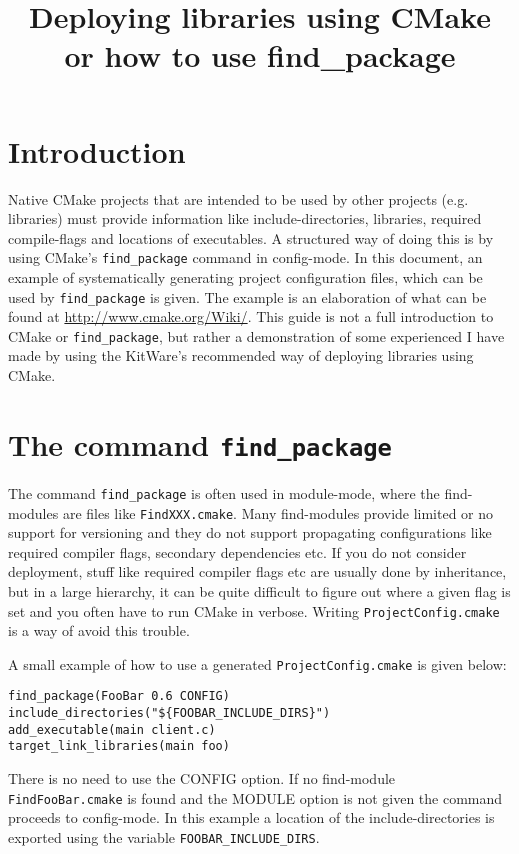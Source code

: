 \documentclass[12pt,a4wide]{article}
\title{\Large Deploying libraries using
  CMake\\
\normalsize
or how to use find\_package}
\begin{document}
\maketitle

\section{Introduction}
Native CMake projects that are intended to be used by other projects
(e.g. libraries) must provide information like include-directories,
libraries, required compile-flags and locations of executables. A
structured way of doing this is by using CMake's
\lstinline{find_package} command in config-mode. In this document, an
example of systematically generating project configuration files,
which can be used by \lstinline{find_package} is given. The example is
an elaboration of what can be found at
\href{http://www.cmake.org/Wiki/CMake/Tutorials/How\_to\_create\_a\_ProjectConfig.cmake\_file}{http://www.cmake.org/Wiki/}. This
guide is not a full introduction to CMake or \lstinline{find_package},
but rather a demonstration of some experienced I have made by using
the KitWare's recommended way of deploying libraries using CMake.

\section{The command \lstinline{find_package}}
The command \lstinline{find_package} is often used in module-mode,
where the find-modules are files like \lstinline{FindXXX.cmake}. Many
find-modules provide limited or no support for versioning and they do
not support propagating configurations like required compiler flags,
secondary dependencies etc. If you do not consider deployment, stuff
like required compiler flags etc are usually done by inheritance, but
in a large hierarchy, it can be quite difficult to figure out where a
given flag is set and you often have to run CMake in verbose. Writing
\lstinline{ProjectConfig.cmake} is a way of avoid this trouble.

A small example of how to use a generated
\lstinline{ProjectConfig.cmake} is given below:
\begin{lstlisting}[frame=single,title=Using a library foo from a package FooBar]
find_package(FooBar 0.6 CONFIG)
include_directories("${FOOBAR_INCLUDE_DIRS}")
add_executable(main client.c)
target_link_libraries(main foo)
\end{lstlisting}
There is no need to use the CONFIG option. If no find-module
\lstinline{FindFooBar.cmake} is found and the MODULE option is not
given the command proceeds to config-mode. In this example a location
of the include-directories is exported using the variable \lstinline{FOOBAR_INCLUDE_DIRS}.
\end{document}
